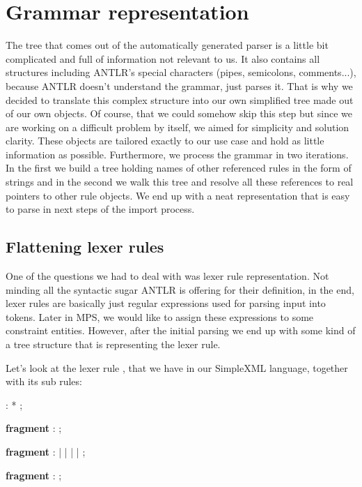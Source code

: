 \section{Grammar representation}

The tree that comes out of the automatically generated parser is a little bit complicated and full of information not relevant to us. It also contains all structures including ANTLR's special characters (pipes, semicolons, comments...), because ANTLR doesn't understand the grammar, just parses it. That is why we decided to translate this complex structure into our own simplified tree made out of our own objects. Of course, that we could somehow skip this step but since we are working on a difficult problem by itself, we aimed for simplicity and solution clarity. These objects are tailored exactly to our use case and hold as little information as possible. Furthermore, we process the grammar in two iterations. In the first we build a tree holding names of other referenced rules in the form of strings and in the second we walk this tree and resolve all these references to real pointers to other rule objects. We end up with a neat representation that is easy to parse in next steps of the import process.

\subsection{Flattening lexer rules}
One of the questions we had to deal with was lexer rule representation. Not minding all the syntactic sugar ANTLR is offering for their definition, in the end, lexer rules are basically just regular expressions used for parsing input into tokens. Later in MPS, we would like to assign these expressions to some constraint entities. However, after the initial parsing we end up with some kind of a tree structure that is representing the lexer rule. 

\pagebreak

Let's look at the lexer rule , that we have in our SimpleXML language, together with its sub rules:

\begin{antlr}
	         :    * ;
	
	\textbf{fragment}
	        :   \regex{[0-9]} ;
	
	\textbf{fragment}
	     :   
	             |   \literal{-} | \literal{_} | 
	             |   
	             ;
	
	\textbf{fragment}
	:   \regex{[:a-zA-Z]} ;
\end{antlr}

